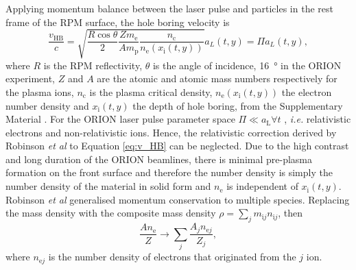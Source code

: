Applying momentum balance between the laser pulse and particles in the rest frame of the \ac{RPM} surface, the hole boring velocity is
\begin{equation}\label{eq:v_HB}
	\frac{v_\mathrm{HB}}{c} = \sqrt{\frac{R\cos\theta}{2}\frac{Zm_\mathrm{e}}{Am_\mathrm{p}}\frac{n_\mathrm{c}}{n_\mathrm{e}(x_\mathrm{i}(t,y))}}a_L(t,y) = \Pi a_L(t,y),
\end{equation}
where $R$ is the RPM reflectivity, $\theta$ is the angle of incidence, \qty{16}{\degree} in the ORION experiment, $Z$ and $A$ are the atomic and atomic mass numbers respectively for the plasma ions, $n_\mathrm{c}$ is the plasma critical density, $n_\mathrm{e}(x_\mathrm{i}(t,y))$ the electron number density and $x_\mathrm{i}(t,y)$
the depth of hole boring, from the Supplementary Material \cite{vincentiOpticalPropertiesRelativistic2014}. For the ORION laser pulse parameter space $\Pi \ll a_\mathrm{L}\forall t$ , \textit{i.e.} relativistic electrons and non-relativistic ions. Hence, the relativistic correction derived by Robinson \textit{et al} \cite{robinsonRelativisticallyCorrectHoleboring2009} to Equation \ref{eq:v_HB} can be neglected. Due to the high contrast and long duration of the ORION beamlines, there is minimal pre-plasma formation on the front surface and therefore the number density is simply the number density of the material in solid form and $n_\mathrm{e}$ is independent of $x_\mathrm{i}(t,y)$. Robinson \textit{et al} \cite{robinsonHoleboringRadiationPressure2009} generalised momentum conservation to multiple species. Replacing the mass density with the composite mass density $\rho = \sum_j m_{\mathrm{i}j}n_{\mathrm{i}j}$, then
\begin{equation}
	\frac{An_\mathrm{e}}{Z} \to \sum_j \frac{A_jn_{\mathrm{e}j}}{Z_j},
\end{equation}
where $n_{\mathrm{e}j}$ is the number density of electrons that originated from the $j$ ion.


